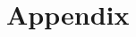 \documentclass[9pt]{pnas-new}
\begin{document}

\begin{multicols}{2}
\section*{\bibname}

\end{multicols}

\newpage

\section*{Appendix}
\label{sec:appendix}
\appendix

\end{document}
